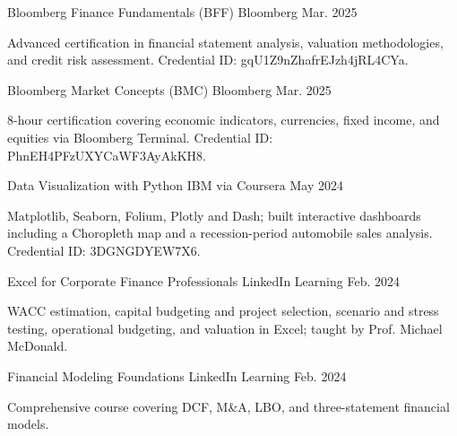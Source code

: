 \begin{cventries}
  \cventry
    {Bloomberg Finance Fundamentals (BFF)} %
    {Bloomberg} %
    {} %
    {Mar. 2025} %
    {
      \begin{cvitems}
        \item {Advanced certification in financial statement analysis, valuation methodologies, and credit risk assessment. Credential ID: gqU1Z9nZhafrEJzh4jRL4CYa.}
      \end{cvitems}
    }

  \cventry
    {Bloomberg Market Concepts (BMC)} %
    {Bloomberg} %
    {} %
    {Mar. 2025} %
    {
      \begin{cvitems}
        \item {8-hour certification covering economic indicators, currencies, fixed income, and equities via Bloomberg Terminal. Credential ID: PhnEH4PFzUXYCaWF3AyAkKH8.}
      \end{cvitems}
    }

  \cventry
    {Data Visualization with Python} %
    {IBM via Coursera} %
    {} %
    {May 2024} %
    {
      \begin{cvitems}
        \item {Matplotlib, Seaborn, Folium, Plotly and Dash; built interactive dashboards including a Choropleth map and a recession-period automobile sales analysis. Credential ID: 3DGNGDYEW7X6.}
      \end{cvitems}
    }

  \cventry
    {Excel for Corporate Finance Professionals} %
    {LinkedIn Learning} %
    {} %
    {Feb. 2024} %
    {
      \begin{cvitems}
        \item {WACC estimation, capital budgeting and project selection, scenario and stress testing, operational budgeting, and valuation in Excel; taught by Prof. Michael McDonald.}
      \end{cvitems}
    }

  \cventry
    {Financial Modeling Foundations} %
    {LinkedIn Learning} %
    {} %
    {Feb. 2024} %
    {
      \begin{cvitems}
        \item {Comprehensive course covering DCF, M\&A, LBO, and three-statement financial models.}
      \end{cvitems}
    }


\end{cventries}
